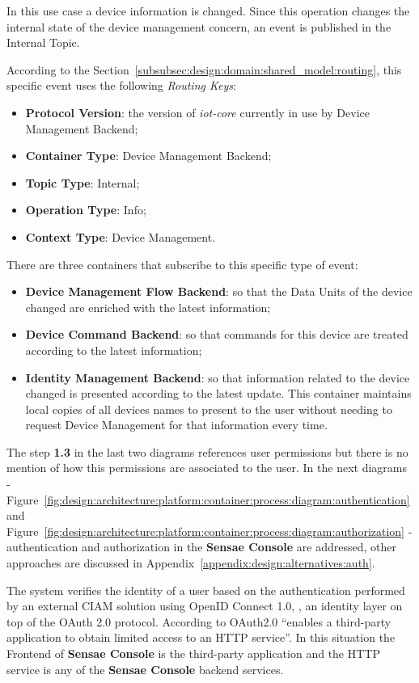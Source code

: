 In this use case a device information is changed. Since this operation changes the internal state of the device management concern, an event is published in the Internal Topic.

According to the Section~\ref{subsubsec:design:domain:shared_model:routing}, this specific event uses the following \textit{Routing Keys}:

\begin{itemize}
   \item \textbf{Protocol Version}: the version of \textit{iot-core} currently in use by Device Management Backend;
   \item \textbf{Container Type}: Device Management Backend;
   \item \textbf{Topic Type}: Internal;
   \item \textbf{Operation Type}: Info;
   \item \textbf{Context Type}: Device Management.
\end{itemize}

There are three containers that subscribe to this specific type of event:

\begin{itemize}
   \item \textbf{Device Management Flow Backend}: so that the Data Units of the device changed are enriched with the latest information;
   \item \textbf{Device Command Backend}: so that commands for this device are treated according to the latest information;
   \item \textbf{Identity Management Backend}: so that information related to the device changed is presented according to the latest update. This container maintains local copies of all devices names to present to the user without needing to request Device Management for that information every time.
\end{itemize}

The step \textbf{1.3} in the last two diagrams references user permissions but there is no mention of how this permissions are associated to the user. In the next diagrams - Figure~\ref{fig:design:architecture:platform:container:process:diagram:authentication} and Figure~\ref{fig:design:architecture:platform:container:process:diagram:authorization} - authentication and authorization in the \textbf{Sensae Console} are addressed, other approaches are discussed in Appendix~\ref{appendix:design:alternatives:auth}.

The system verifies the identity of a user based on the authentication performed by an external \gls{CIAM} solution using OpenID Connect 1.0, \cite{openid}, an identity layer on top of the OAuth 2.0 protocol. According to \cite{oauth} OAuth2.0 ``enables a third-party application to obtain limited access to an HTTP service''. In this situation the Frontend of \textbf{Sensae Console} is the third-party application and the HTTP service is any of the \textbf{Sensae Console} backend services.

